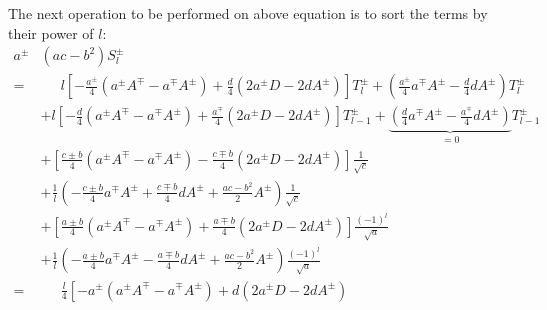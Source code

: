 The next operation to be performed on above equation is to sort the terms by their power of $l$:
\begin{align}
  a^{\pm} & \left(ac-b^2\right) S^{\pm}_l \nonumber \\
  =& \phantom{+}~ l \left[
                    - \frac{a^{\pm}}{4} \left(   a^{\pm} A^{\mp} -   a^{\mp} A^{\pm} \right)
                    + \frac{d      }{4} \left( 2 a^{\pm} D       - 2 d       A^{\pm} \right)
                  \right] T^{\pm}_l
                  +
                  \left(
                      \frac{a^{\pm}}{4} a^{\mp} A^{\pm}
                    - \frac{d      }{4} d       A^{\pm}
                  \right) T^{\pm}_l \nonumber \\
  ~&          + l \left[
                    - \frac{d      }{4} \left(   a^{\pm} A^{\mp} -   a^{\mp} A^{\pm} \right)
                    + \frac{a^{\mp}}{4} \left( 2 a^{\pm} D       - 2 d       A^{\pm} \right)
                  \right] T^{\pm}_{l-1}
                  +
                  \underbrace{\left(
                      \frac{d      }{4} a^{\mp} A^{\pm}
                    - \frac{a^{\mp}}{4} d       A^{\pm}
                  \right)}_{=0} T^{\pm}_{l-1} \nonumber \\
  ~&          +   \left[
                      \frac{c \pm b}{4} \left(   a^{\pm} A^{\mp} -   a^{\mp} A^{\pm} \right)
                    - \frac{c \mp b}{4} \left( 2 a^{\pm} D       - 2 d       A^{\pm} \right)
                  \right] \frac{1}{\sqrt{c}} \nonumber \\
  ~&          +   \frac{1}{l} \left(
                    - \frac{c \pm b}{4} a^{\mp} A^{\pm}
                    + \frac{c \mp b}{4} d       A^{\pm}
                    + \frac{ac-b^2}{2} A^{\pm}
                  \right) \frac{1}{\sqrt{c}} \nonumber \\
  ~&          +   \left[
                      \frac{a \pm b}{4} \left(   a^{\pm} A^{\mp} -   a^{\mp} A^{\pm} \right)
                    + \frac{a \mp b}{4} \left( 2 a^{\pm} D       - 2 d       A^{\pm} \right)
                  \right] \frac{(-1)^l}{\sqrt{a}} \nonumber \\
  ~&          +   \frac{1}{l} \left(
                    - \frac{a \pm b}{4} a^{\mp} A^{\pm}
                    - \frac{a \mp b}{4} d       A^{\pm}
                    + \frac{ac-b^2}{2} A^{\pm}
                  \right) \frac{(-1)^l}{\sqrt{a}} \nonumber \\
  =& \phantom{+}~ \frac{l}{4} \left[
                    - a^{\pm} \left(   a^{\pm} A^{\mp} -   a^{\mp} A^{\pm} \right)
                    + d       \left( 2 a^{\pm} D       - 2 d       A^{\pm} \right)

\end{align}
